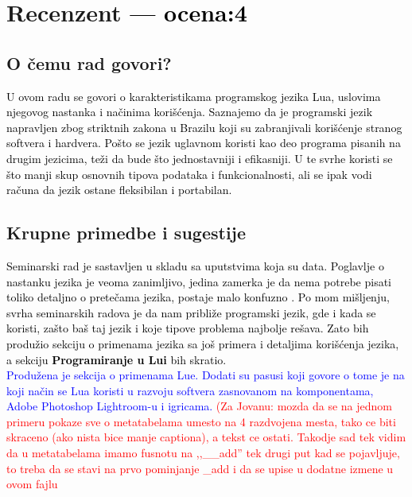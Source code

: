 \documentclass[a4paper]{report}
\newcommand{\odgovor}[1]{\textcolor{black}{#1}}
\newcommand{\odgovorAutora}[1]{\textcolor{blue}{#1}}
\newcommand{\note}[1]{\textcolor{red}{#1}}
\begin{document}
\chapter{Recenzent \odgovor{--- ocena:4} }


\section{O čemu rad govori?}
\odgovor{
U ovom radu se govori o karakteristikama programskog jezika Lua, uslovima njegovog nastanka i načinima korišćenja. Saznajemo da je programski jezik napravljen zbog striktnih zakona u Brazilu koji su zabranjivali korišćenje stranog softvera i hardvera. Pošto se jezik uglavnom koristi kao deo programa pisanih na drugim jezicima, teži da bude što jednostavniji i efikasniji. U te svrhe koristi se što manji skup osnovnih tipova podataka i funkcionalnosti, ali se ipak vodi računa da jezik ostane fleksibilan i portabilan. 
}

\section{Krupne primedbe i sugestije}
\odgovor{
Seminarski rad je sastavljen u skladu sa uputstvima koja su data. Poglavlje o nastanku jezika je veoma zanimljivo, jedina zamerka je da nema potrebe pisati toliko detaljno o pretečama jezika, postaje malo konfuzno .\newline
Po mom mišljenju, svrha seminarskih radova je da nam približe programski jezik, gde i kada se koristi, zašto baš taj jezik i koje tipove problema najbolje rešava. Zato bih produžio sekciju o primenama jezika sa još primera i detaljima korišćenja jezika, a sekciju 
\textbf{Programiranje u Lui} bih skratio.\\
\odgovorAutora{Produžena je sekcija o primenama Lue. Dodati su pasusi koji govore o tome je na koji način se Lua koristi u razvoju softvera zasnovanom na komponentama, Adobe Photoshop Lightroom-u i igricama.}
\note{(Za Jovanu: mozda da se na jednom primeru pokaze sve o metatabelama umesto na 4 razdvojena mesta, tako ce biti skraceno (ako nista bice manje captiona), a tekst ce ostati. Takodje sad tek vidim da u metatabelama imamo fusnotu na ,,\_\_add'' tek drugi put kad se pojavljuje, to treba da se stavi na prvo pominjanje \_add i da se upise u dodatne izmene u ovom fajlu}  
}
\end{document}
